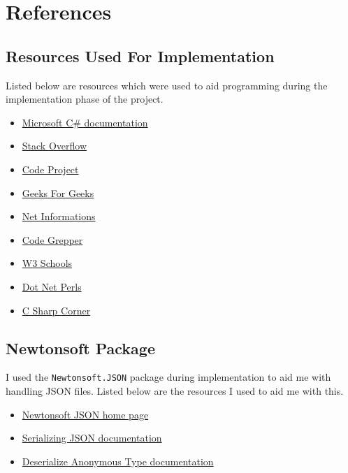 \chapter{References}

\section{Resources Used For Implementation}
Listed below are resources which were used to aid programming during the implementation phase of the project.
\begin{itemize}
    \item \href{https://docs.microsoft.com/en-us/dotnet/csharp/}{Microsoft C\# documentation}
    \item \href{https://stackoverflow.com/}{Stack Overflow}
    \item \href{https://www.codeproject.com/}{Code Project}
    \item \href{https://www.geeksforgeeks.org/}{Geeks For Geeks}
    \item \href{http://net-informations.com/}{Net Informations}
    \item \href{https://www.codegrepper.com/}{Code Grepper}
    \item \href{https://www.w3schools.com/}{W3 Schools}
    \item \href{https://www.dotnetperls.com/}{Dot Net Perls}
    \item \href{https://www.c-sharpcorner.com/}{C Sharp Corner}
\end{itemize}

\section{Newtonsoft Package}
I used the \verb|Newtonsoft.JSON| package during implementation to aid me with handling JSON files. Listed below are the resources I used to aid me with this.
\begin{itemize}
    \item \href{https://www.newtonsoft.com/json}{Newtonsoft JSON home page}
    \item \href{https://www.newtonsoft.com/json/help/html/SerializingJSON.htm}{Serializing JSON documentation}
    \item \href{https://www.newtonsoft.com/json/help/html/DeserializeAnonymousType.htm}{Deserialize Anonymous Type documentation}
\end{itemize}
